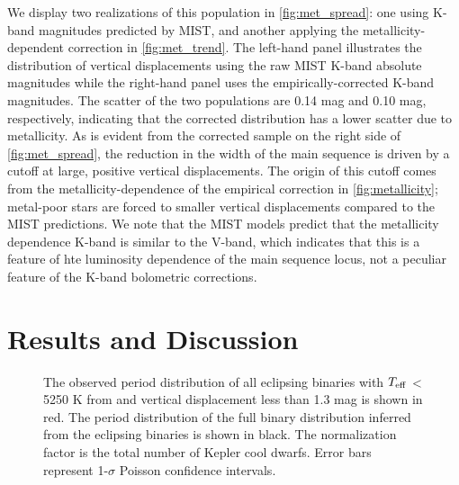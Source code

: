 \documentclass[manuscript]{aastex6}
\newcommand{\Teff}{\ensuremath{T_{\rm eff}}}
\begin{document}
We display two realizations of this population in \cref{fig:met_spread}: one
using K-band magnitudes predicted by MIST, and another applying the
metallicity-dependent correction in \cref{fig:met_trend}.
The left-hand panel illustrates the distribution of vertical displacements 
using the raw MIST K-band absolute magnitudes while the right-hand panel
uses the empirically-corrected K-band magnitudes. The scatter of the two
populations are 0.14 mag and 0.10 mag, respectively, indicating that the
corrected distribution has a lower scatter due to metallicity.
As is evident from the corrected sample on the right side of 
\cref{fig:met_spread}, the reduction in the width of the main 
sequence is driven by a cutoff at large, positive vertical displacements.
The origin of this cutoff comes from the metallicity-dependence of the empirical 
correction in \cref{fig:metallicity}; metal-poor stars are forced to smaller 
vertical displacements compared to the MIST predictions. We note that the MIST 
models predict that the metallicity dependence K-band is similar to the V-band,
which indicates that this is a feature of hte luminosity dependence of the main
sequence locus, not a peculiar feature of the K-band bolometric corrections.

\section{Results and Discussion}
\label{sec:results}

\begin{figure}[htb]
    \centering
    \caption{The observed period distribution of all eclipsing binaries with
    \Teff{} < 5250 K from \citet{Pinsonneault12} and vertical displacement less
than 1.3 mag is shown in red. The period distribution of the full binary
distribution inferred from the eclipsing binaries is shown in black. The
normalization factor is the total number of Kepler cool dwarfs. Error bars
represent 1-\(\sigma\) Poisson confidence intervals.}\label{fig:ebdist}
\end{figure}
\end{document}

